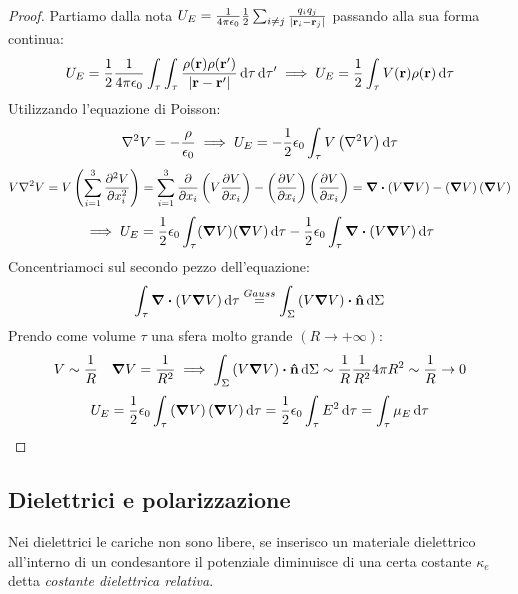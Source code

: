 \documentclass[12pt,a4paper]{article}
\begin{document}
\begin{proof}
    Partiamo dalla nota $U_{E}= \frac{1}{4\pi\epsilon_0}\frac{1}{2}\sum_{i\neq j}\frac{q_iq_j}{\abs{\vb{r}_i-\vb{r}_j}} $ passando alla sua forma continua:
    \begin{equation*}
        U_E= \frac{1}{2}\frac{1}{4\pi\epsilon_0}\int_\tau\int_\tau\frac{\rho(\vb{r})\rho(\vb{r}')}{\abs{\vb{r}-\vb{r}'}}\dd{\tau}\dd{\tau'}\implies
        U_E= \frac{1}{2}\int_\tau V(\vb{r})\rho(\vb{r}) \dd{\tau}
    \end{equation*}
    Utilizzando l'equazione di Poisson:
    \begin{equation*}
        \laplacian V = -\frac{\rho}{\epsilon_0}\implies U_E = -\frac{1}{2}\epsilon_0\int_\tau V \left( \laplacian{V} \right)\dd{\tau}
    \end{equation*}
    \begin{equation*}
        V \laplacian{V}= V \left(\sum_{i=1}^{3} \pdv[2]{V}{x_i}\right)= \sum_{i=1}^{3}\pdv{}{x_i}\left( V \pdv{V}{x_i} \right)- \left( \pdv{V}{x_i} \right)\left( \pdv{V}{x_i} \right)
        = \div \left( V \grad{V} \right)- \left( \grad{V} \right)\left( \grad{V} \right) 
    \end{equation*}
    \begin{equation*}
       \implies U_E = \frac{1}{2} \epsilon_0\int_\tau(\grad{V})(\grad{V}) \dd{\tau}-\frac{1}{2}\epsilon_0\int_\tau\div(V\grad{V})\dd{\tau}
    \end{equation*}
    Concentriamoci sul secondo pezzo dell'equazione:
    \begin{equation*}
        \int_\tau\div(V\grad{V})\dd{\tau} \overset{Gauss}{=} \int_\Sigma\left( V\grad{V} \right)\vdot\vu{n}\dd{\Sigma}
    \end{equation*}
    Prendo come volume $\tau$ una sfera molto grande $(R\rightarrow+\infty)$:
    \begin{equation*}
        V \sim \frac{1}{R}  \quad\grad{V}= \frac{1}{R^2}\implies \int_\Sigma \left( V\grad{V} \right)\vdot\vu{n}\dd{\Sigma}
        \sim \frac{1}{R}\frac{1}{R^2}4\pi R^2 \sim \frac{1}{R}\rightarrow 0 
    \end{equation*}
    \begin{equation*}
        U_E = \frac{1}{2}\epsilon_0\int_{\tau}\left( \grad{V} \right)\left( \grad{V} \right)\dd{\tau}= \frac{1}{2}\epsilon_0\int_{\tau}
        E^2 \dd{\tau}= \int_\tau  \mu_E \dd{\tau}
    \end{equation*}
\end{proof}

\subsection{Dielettrici e polarizzazione}
Nei dielettrici le cariche non sono libere, se inserisco un materiale dielettrico all'interno di un condesantore 
il potenziale diminuisce di una certa costante $\kappa_e$ detta \textit{costante dielettrica relativa}.
\end{document}
